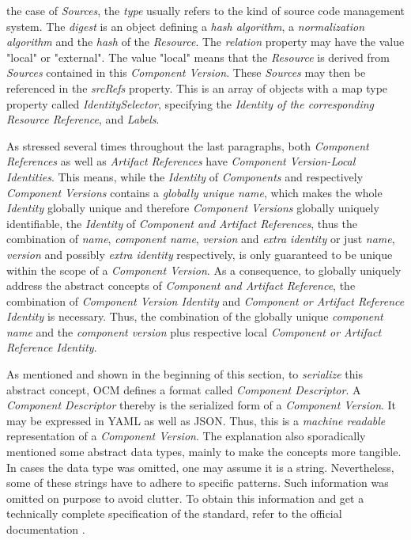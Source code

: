 the case of \emph{Sources}, the \emph{type} usually refers to the kind of source code management system. The \emph{digest} is an object defining a \emph{hash algorithm}, a \emph{normalization algorithm} and the \emph{hash} of the \emph{Resource}. The \emph{relation} property may have the value "local" or "external". The value "local" means that the \emph{Resource} is derived from \emph{Sources} contained in this \emph{Component Version}. These \emph{Sources} may then be referenced in the \emph{srcRefs} property. This is an array of objects with a map type property called \emph{IdentitySelector}, specifying the \emph{Identity of the corresponding Resource Reference}, and \emph{Labels}.\par
As stressed several times throughout the last paragraphs, both \emph{Component References} as well as \emph{Artifact References} have \emph{Component Version-Local Identities}. This means, while the \emph{Identity} of \emph{Components} and respectively \emph{Component Versions} contains a \emph{globally unique name}, which makes the whole \emph{Identity} globally unique and therefore \emph{Component Versions} globally uniquely identifiable, the \emph{Identity} of \emph{Component and Artifact References}, thus the combination of \emph{name}, \emph{component name}, \emph{version} and \emph{extra identity} or just \emph{name}, \emph{version} and possibly \emph{extra identity} respectively, is only guaranteed to be unique within the scope of a \emph{Component Version}. As a consequence, to globally uniquely address the abstract concepts of \emph{Component and Artifact Reference}, the combination of \emph{Component Version Identity} and \emph{Component or Artifact Reference Identity} is necessary. Thus, the combination of the globally unique \emph{component name} and the \emph{component version} plus respective local \emph{Component or Artifact Reference Identity}.\par
\noindent As mentioned and shown in the beginning of this section, to \emph{serialize} this abstract concept, OCM defines a format called \emph{Component Descriptor}. A \emph{Component Descriptor} thereby is the serialized form of a \emph{Component Version}. It may be expressed in YAML as well as JSON. Thus, this is a \emph{machine readable} representation of a \emph{Component Version}. The explanation also sporadically mentioned some abstract data types, mainly to make the concepts more tangible. In cases the data type was omitted, one may assume it is a string. Nevertheless, some of these strings have to adhere to specific patterns. Such information was omitted on purpose to avoid clutter. To obtain this information and get a technically complete specification of the standard, refer to the official documentation \cite{OCMSpec}.

